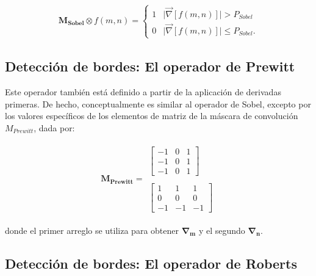 \begin{eqnarray}
	\mathbf{M_{Sobel}} \otimes f(m, n) = \left\{ \begin{array}{ll} 
	1 & \mbox{$\lvert \vec{\nabla} \left[ f(m, n) \right] \rvert > P_{Sobel}$}\\
	0 & \mbox{$\lvert \vec{\nabla} \left[ f(m, n) \right] \rvert \le P_{Sobel}$}.\end{array} \right.
\label{EqLXXIX}
\end{eqnarray}


\subsection{Detecci\'on de bordes: El operador de Prewitt}
\label{CapV_3}

Este operador tambi\'en est\'a definido a partir de la aplicaci\'on de derivadas primeras. De hecho, conceptualmente es similar al operador 
de Sobel, excepto por los valores espec\'ificos de los elementos de matriz de la m\'ascara de convoluci\'on $M_{Prewitt}$, dada por:


\begin{eqnarray}
	\mathbf{M_{Prewitt}} = \begin{array}{c} \left[ \begin{array}{ccc}  -1 & 0 & 1  \\  -1 & 0 & 1 \\ -1 & 0 & 1 \end{array} \right] 
	\\ \nonumber \\ \nonumber 
	\left[ \begin{array}{ccc}  1 & 1 & 1  \\  0 & 0 & 0 \\ -1 & -1 & -1 \end{array} \right] \end{array}
\label{EqLXXX}
\end{eqnarray}

donde el primer arreglo se utiliza para obtener $\mathbf{\nabla_{m}}$ y el segundo $\mathbf{\nabla_{n}}$.


\subsection{Detecci\'on de bordes: El operador de Roberts}
\label{CapV_4}

